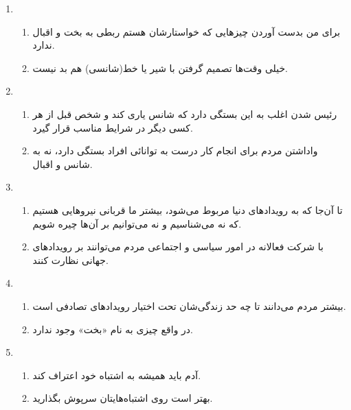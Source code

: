 \documentclass[a4paper,10pt]{article}
\begin{document}
\begin{enumerate}
\hdashline

 \item \begin{enumerate}
        \item برای من بدست آوردن چیزهایی که خواستارشان هستم ربطی به بخت و اقبال ندارد.
	\item خیلی وقت‌ها تصمیم گرفتن با شیر یا خط(شانسی) هم بد نیست.
       \end{enumerate}

\hdashline

 \item \begin{enumerate}
        \item رئیس شدن اغلب به این بستگی دارد که شانس یاری کند و شخص قبل از هر کسی دیگر در شرایط مناسب قرار گیرد.
	\item واداشتن مردم برای انجام کار درست به توانائی افراد بستگی دارد، نه به شانس و اقبال.
       \end{enumerate}

\hdashline

 \item \begin{enumerate}
        \item تا آن‌جا که به رویدادهای دنیا مربوط می‌شود، بیشتر ما قربانی نیروهایی هستیم که نه می‌شناسیم و نه می‌توانیم بر آن‌ها چیره شویم.
	\item با شرکت فعالانه در امور سیاسی و اجتماعی مردم می‌توانند بر رویدادهای جهانی نظارت کنند.
       \end{enumerate}

\hdashline

 \item \begin{enumerate}
        \item بیشتر مردم می‌دانند تا چه حد زندگی‌شان تحت اختیار رویدادهای تصادفی است.
	\item در واقع چیزی به نام «بخت» وجود ندارد.
       \end{enumerate}

\hdashline

 \item \begin{enumerate}
        \item آدم باید همیشه به اشتباه خود اعتراف کند.
	\item بهتر است روی اشتباه‌هایتان سرپوش بگذارید.
       \end{enumerate}

\hdashline


\end{enumerate}
\end{document}
